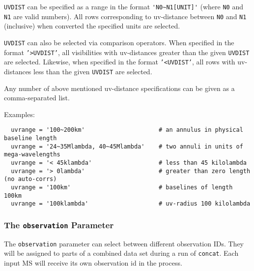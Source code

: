 {\tt UVDIST} can be specified as a range in the format 
{\verb!'N0~N1[UNIT]'!} (where {\tt N0} and {\tt N1} are valid numbers).  All
rows corresponding to uv-distance between {\tt N0} and {\tt N1}
(inclusive) when converted the specified units are selected.

{\tt UVDIST} can also be selected via comparison operators.  When specified in
the format {\tt '>UVDIST'}, all visibilities with uv-distances greater than the
given {\tt UVDIST} are selected.  Likewise, when specified in the
format {\tt '<UVDIST'}, all rows with uv-distances less than the given
{\tt UVDIST} are selected.


Any number of above mentioned uv-distance specifications can be given
as a comma-separated list.

Examples:
\small
\begin{verbatim}
  uvrange = '100~200km'                     # an annulus in physical baseline length
  uvrange = '24~35Mlambda, 40~45Mlambda'    # two annuli in units of mega-wavelengths
  uvrange = '< 45klambda'                   # less than 45 kilolambda 
  uvrange = '> 0lambda'                     # greater than zero length (no auto-corrs)
  uvrange = '100km'                         # baselines of length 100km
  uvrange = '100klambda'                    # uv-radius 100 kilolambda
\end{verbatim}
\normalsize



\subsubsection{The {\tt observation} Parameter}
\label{section:io.selection.selectdata.observation}

The {\tt observation} parameter can select between different
observation IDs. They will be assigned to parts of a combined data set during a
run of {\tt concat}. Each input MS will receive its own observation id
in the process. 


